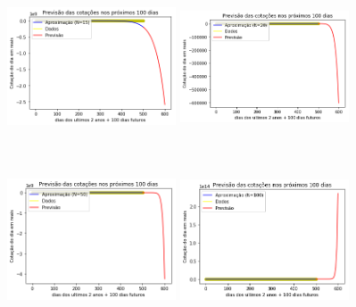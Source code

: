 \documentclass{article}
\begin{document}
\begin{figure}[!htb]
\includegraphics [width=5cm,height=5cm]{Previsao (usando Gauss)/P15.png}
\includegraphics [width=5cm,height=5cm]{Previsao (usando Gauss)/P20.png}
\includegraphics [width=5cm,height=5cm]{Previsao (usando Gauss)/P50.png}
\includegraphics [width=5cm,height=5cm]{Previsao (usando Gauss)/P100.png}
\end{figure}
\end{document}
